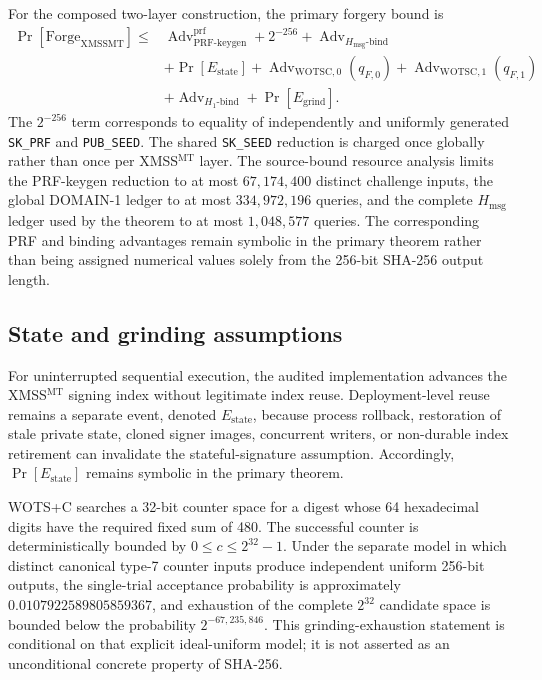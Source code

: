 \documentclass[pdflatex,sn-mathphys-num]{sn-jnl}
\begin{document}
For the composed two-layer construction, the primary forgery bound is
\[
\begin{aligned}
\Pr[\mathrm{Forge}_{\mathrm{XMSSMT}}]
\le{}&
  \operatorname{Adv}^{\mathrm{prf}}_{\mathrm{PRF\mbox{-}keygen}}
  + 2^{-256}
  + \operatorname{Adv}_{H_{\mathrm{msg}}\text{-}\mathrm{bind}}
  \\[2pt]
 &+
  \Pr[E_{\mathrm{state}}]
  + \operatorname{Adv}_{\mathrm{WOTSC},0}(q_{F,0})
  + \operatorname{Adv}_{\mathrm{WOTSC},1}(q_{F,1})
  \\[2pt]
 &+
  \operatorname{Adv}_{H_1\text{-}\mathrm{bind}}
  + \Pr[E_{\mathrm{grind}}].
\end{aligned}
\]
The $2^{-256}$ term corresponds to equality of independently and uniformly
generated \texttt{SK\_PRF} and \texttt{PUB\_SEED}. The shared
\texttt{SK\_SEED} reduction is charged once globally rather than once per
XMSS$^{\mathrm{MT}}$ layer. The source-bound resource analysis limits the
PRF-keygen reduction to at most $67{,}174{,}400$ distinct challenge inputs,
the global DOMAIN-1 ledger to at most $334{,}972{,}196$ queries, and the
complete $H_{\mathrm{msg}}$ ledger used by the theorem to at most
$1{,}048{,}577$ queries. The corresponding PRF and binding advantages remain
symbolic in the primary theorem rather than being assigned numerical values
solely from the 256-bit SHA-256 output length.

\subsection{State and grinding assumptions}
\label{subsec:wotsc_state_grinding}

For uninterrupted sequential execution, the audited implementation advances
the XMSS$^{\mathrm{MT}}$ signing index without legitimate index reuse.
Deployment-level reuse remains a separate event, denoted
$E_{\mathrm{state}}$, because process rollback, restoration of stale private
state, cloned signer images, concurrent writers, or non-durable index
retirement can invalidate the stateful-signature assumption. Accordingly,
$\Pr[E_{\mathrm{state}}]$ remains symbolic in the primary theorem.

WOTS+C searches a 32-bit counter space for a digest whose 64 hexadecimal
digits have the required fixed sum of 480. The successful counter is
deterministically bounded by
$0\le c\le 2^{32}-1$. Under the separate model in which distinct canonical
type-7 counter inputs produce independent uniform 256-bit outputs, the
single-trial acceptance probability is approximately
$0.0107922589805859367$, and exhaustion of the complete $2^{32}$ candidate
space is bounded below the probability $2^{-67{,}235{,}846}$. This
grinding-exhaustion statement is conditional on that explicit ideal-uniform
model; it is not asserted as an unconditional concrete property of SHA-256.
\end{document}
